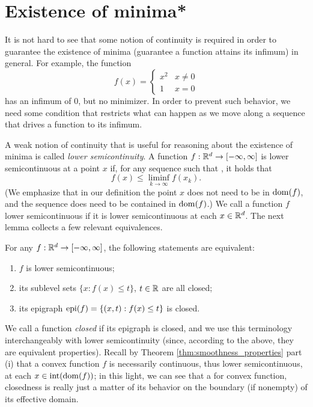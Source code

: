 \section{Existence of minima*}
\label{sec:existence_minima}

It is not hard to see that some notion of continuity is required in order to
guarantee the existence of minima (guarantee a function attains its infimum) in
general. For example, the function
\begin{equation}
\label{eq:discontinuous_quadratic}
f(x) = \begin{cases}
x^2 & x \not= 0 \\
1 & x = 0
\end{cases}
\end{equation}
has an infimum of 0, but no minimizer. In order to prevent such behavior, we
need some condition that restricts what can happen as we move along a sequence
that drives a function to its infimum.  

A weak notion of continuity that is useful for reasoning about the existence  
of minima is called \emph{lower semicontinuity}. A function $f : \mathbb{R}^d \to 
[-\infty, \infty]$ is lower semicontinuous at a point $x$ if, for any sequence 
such that , it holds that 
\[
f(x) \leq \liminf_{k \to \infty} f(x_k). 
\]
(We emphasize that in our definition the point $x$ does not need to be in
$\operatorname{dom}(f)$, and the sequence  does need to be
contained in $\operatorname{dom}(f)$.)  We call a function $f$ lower semicontinuous if it
is lower semicontinuous at each $x \in \mathbb{R}^d$. The next lemma collects a few 
relevant equivalences.

\begin{Lemma}
\label{lem:lower_semicontinuous}
For any $f : \mathbb{R}^d \to [-\infty, \infty]$, the following statements are equivalent:
\begin{enumerate}[label=(\roman*)]
\item $f$ is lower semicontinuous;
\item its sublevel sets $\{x : f(x) \leq t\}$, $t \in \mathbb{R}$ are all closed;
\item its epigraph $\operatorname{epi}(f) = \{(x,t) : f(x) \leq t\}$ is closed. 
\end{enumerate}
\end{Lemma}

We call a function \emph{closed} if its epigraph is closed, and we use this
terminology interchangeably with lower semicontinuity (since, according to the
above, they are equivalent properties). Recall by Theorem
\ref{thm:smoothness_properties} part (i) that a convex function $f$ is
necessarily continuous, thus lower semicontinuous, at each $x \in
\operatorname{int}(\operatorname{dom}(f))$; in this light, we can see that a for convex function,
closedness is really just a matter of its behavior on the boundary (if nonempty)
of its effective domain.

